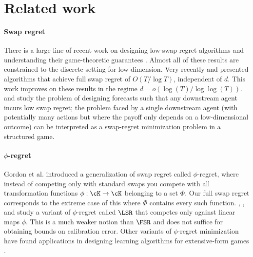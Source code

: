 \section{Related work}
\paragraph{Swap regret} There is a large line of recent work on designing low-swap regret algorithms and understanding their game-theoretic guarantees \citep{braverman2018selling, deng2019prior, deng2019strategizing, camara2020mechanisms, mansour2022strategizing, cai2023selling, brown2024learning, haghtalab2024calibrated}. Almost all of these results are constrained to the discrete setting for low dimension. Very recently  \cite{dagan2023external} and \cite{peng2023fast} presented algorithms that achieve full swap regret of $O(T/\log T)$, independent of $d$. This work improves on these results in the regime $d = o(\log(T)/\log\log(T))$. \cite{roth2024forecasting} and \cite{hu2024calibrationerrordecisionmaking} study the problem of designing forecasts such that any downstream agent incurs low swap regret; the problem faced by a single downstream agent (with potentially many actions but where the payoff only depends on a low-dimensional outcome) can be interpreted as a swap-regret minimization problem in a structured game. 

\paragraph{$\phi$-regret} Gordon et al. \citep{GordonGreenwaldMarks2008} introduced a generalization of swap regret called $\phi$-regret, where instead of competing only with standard swaps you compete with all transformation functions $\phi:\cK\rightarrow \cK$ belonging to a set $\Phi$. Our full swap regret corresponds to the extreme case of this where $\Phi$ contains every such function. \cite{mansour2022strategizing}, \cite{farina2024polynomial}, and \cite{daskalakis2024efficient} study a variant of $\phi$-regret called $\LSR$ that competes only against linear maps $\phi$. This is a much weaker notion than $\FSR$ and does not suffice for obtaining bounds on calibration error.  Other variants of $\phi$-regret minimization have found applications in designing learning algorithms for extensive-form games \citep{celli2021decentralized, bai2022efficient, zhang2024efficient}. 


